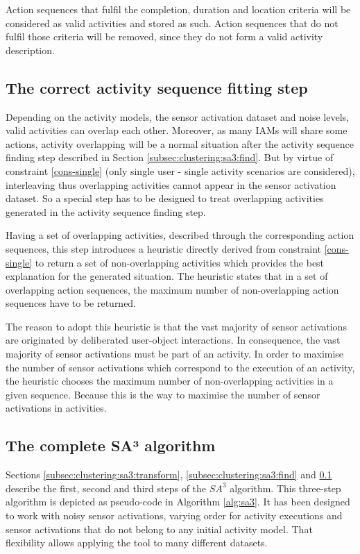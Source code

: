Action sequences that fulfil the completion, duration and location criteria will be considered as valid activities and stored as such. Action sequences that do not fulfil those criteria will be removed, since they do not form a valid activity description.  

\subsection{The correct activity sequence fitting step}
\label{subsec:clustering:sa3:fit}
Depending on the activity models, the sensor activation dataset and noise levels, valid activities can overlap each other. Moreover, as many IAMs will share some actions, activity overlapping will be a normal situation after the activity sequence finding step described in Section \ref{subsec:clustering:sa3:find}. But by virtue of constraint \ref{cons-single} (only single user - single activity scenarios are considered), interleaving thus overlapping activities cannot appear in the sensor activation dataset. So a special step has to be designed to treat overlapping activities generated in the activity sequence finding step. 

Having a set of overlapping activities, described through the corresponding action sequences, this step introduces a heuristic directly derived from constraint \ref{cons-single} to return a set of non-overlapping activities which provides the best explanation for the generated situation. The heuristic states that in a set of overlapping action sequences, the maximum number of non-overlapping action sequences have to be returned. 

The reason to adopt this heuristic is that the vast majority of sensor activations are originated by deliberated user-object interactions. In consequence, the vast majority of sensor activations must be part of an activity. In order to maximise the number of sensor activations which correspond to the execution of an activity, the heuristic chooses the maximum number of non-overlapping activities in a given sequence. Because this is the way to maximise the number of sensor activations in activities.
 

\subsection{The complete SA³ algorithm}
\label{subsec:clustering:sa3:complete}

Sections \ref{subsec:clustering:sa3:transform}, \ref{subsec:clustering:sa3:find} and \ref{subsec:clustering:sa3:fit} describe the first, second and third steps of the $SA^3$ algorithm. This three-step algorithm is depicted as pseudo-code in Algorithm \ref{alg:sa3}. It has been designed to work with noisy sensor activations, varying order for activity executions and sensor activations that do not belong to any initial activity model. That flexibility allows applying the tool to many different datasets. 

